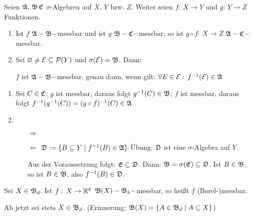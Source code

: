 \documentclass[a4paper,twoside,DIV15,BCOR12mm,chapterprefix=true,headings=onelinechapter]{scrbook}
\begin{document}
\begin{satz}
\label{Satz 3.1}
Seien \(\mathfrak{A},\,\mathfrak{B}\,\mathfrak{C}\) \(\sigma\)-Algebren auf \(X,\,Y\) bzw. \(Z\). Weiter seien \(f:\,X\to Y\) und \(g:\,Y\to Z\)
Funktionen.
\begin{enumerate}
\item Ist \(f\) \(\mathfrak{A}-\mathfrak{B}-\)messbar und ist \(g\) \(\mathfrak{B}-\mathfrak{C}-\)messbar, so ist \(g\circ f:\,X\to Z\) \(\mathfrak{A}-\mathfrak{C}-\)messbar.
\item Sei \(\varnothing\neq\mathcal{E}\subseteq\mathcal{P}(Y)\) und \(\sigma(\mathcal{E})=\mathfrak{B}\). Dann:
\begin{center}
\(f\) ist \(\mathfrak{A}-\mathfrak{B}-\)messbar, genau dann, wenn gilt: \(\forall E\in\mathcal{E}:\,f^{-1}(\mathcal{E})\in\mathfrak{A}\)
\end{center}
\end{enumerate}
\end{satz}

\begin{beweis}
\begin{enumerate}
\item Sei \(C\in\mathfrak{C}\); \(g\) ist messbar, daraus folgt \(g^{-1}(C)\in\mathfrak{B}\);
\(f\) ist messbar, daraus folgt \(f^{-1}(g^{-1}(C))=(g\circ f)^{-1}(C)\in\mathfrak{A}\)
\item \begin{itemize}
\item[\(\Rightarrow\)] \checkmark
\item[\(\Leftarrow\)] \(\mathfrak{D}:=\{B\subseteq Y\mid f^{-1}(B)\in\mathfrak{A}\}\)
\"Ubung: \(\mathfrak{D}\) ist eine \(\sigma\)-Algebra auf \(Y\).

Aus der Voraussetzung folgt: \(\mathfrak{E}\subseteq\mathfrak{D}\).
Dann: \(\mathfrak{B}=\sigma(\mathfrak{E})\subseteq\mathfrak{D}\). Ist \(B\in\mathfrak{B}\), so ist \(B\in\mathfrak{B}\), also
\(f^{-1}(B)\in\mathfrak{D}\).
\end{itemize}
\end{enumerate}
\end{beweis}

\begin{definition}
Sei \(X\in\mathfrak{B}_{d}\). Ist \(f:\,X\to\mathbb{R}^{k}\) \(\mathfrak{B}(X)-\mathfrak{B}_{k}-\)messbar, so hei\ss t \(f\) (Borel-)messbar.
\end{definition}
Ab jetzt sei stets \(X\in\mathfrak{B}_{d}\). (Erinnerung: \(\mathfrak{B}(X)=\{A\in\mathfrak{B}_{d}\mid A\subseteq X\}\))
\end{document}
